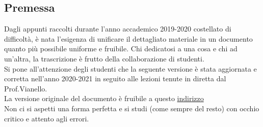 \documentclass[12pt,a4paper,headings=optiontohead,openany]{scrbook}
\begin{document}
\begin{center}
\pagebreak

\section*{Premessa}
\begin{minipage}{0.9\textwidth} \large

Dagli appunti raccolti durante l'anno accademico 2019-2020 costellato di difficoltà, è nata l'esigenza di unificare il dettagliato materiale in un documento quanto più possibile uniforme e fruibile. Chi dedicatosi a una cosa e chi ad un'altra, la trascrizione è frutto della collaborazione di studenti. \\

Si pone all'attenzione degli studenti che la seguente versione è stata aggiornata e corretta nell'anno 2020-2021 in seguito alle lezioni tenute in diretta dal Prof.Vianello.\\
La versione originale del documento è fruibile a questo \href{https://github.com/micheleveronesi/AppuntiCalcolo}{indirizzo}\\

Non ci si aspetti una forma perfetta e si studi (come sempre del resto) con occhio critico e attento agli errori.\\

\end{minipage}
\end{center}
\pagebreak

\end{document}
